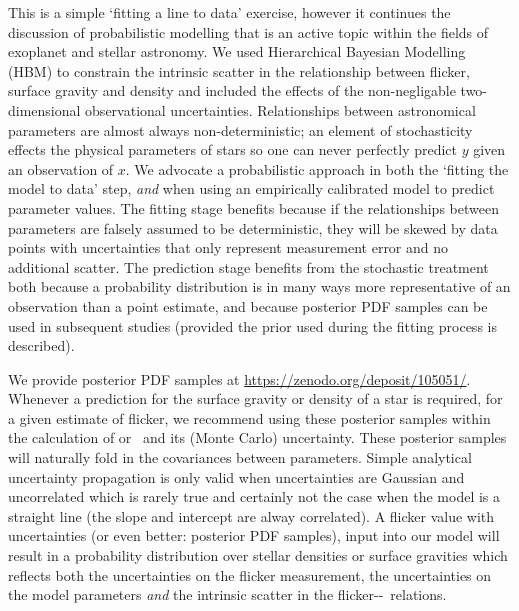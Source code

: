 This is a simple `fitting a line to data' exercise, however it continues the
discussion of probabilistic modelling that is an active topic within the
fields of exoplanet and stellar astronomy.
We used Hierarchical Bayesian Modelling (HBM) to constrain the intrinsic
scatter in the relationship between flicker, surface gravity and density and
included the effects of the non-negligable two-dimensional observational
uncertainties.
Relationships between astronomical parameters are almost always
non-deterministic; an element of stochasticity effects the physical parameters
of stars so one can never perfectly predict $y$ given an observation of $x$.
We advocate a probabilistic approach in both the `fitting the model to data'
step, {\it and} when using an empirically calibrated model to predict
parameter values.
The fitting stage benefits because if the relationships between parameters are
falsely assumed to be deterministic, they will be skewed by data points with
uncertainties that only represent measurement error and no additional scatter.
The prediction stage benefits from the stochastic treatment both because a
probability distribution is in many ways more representative of an observation
than a point estimate, and because posterior PDF samples can be used in
subsequent studies (provided the prior used during the fitting process is
described).

We provide posterior PDF samples at \url{https://zenodo.org/deposit/105051/}.
Whenever a prediction for the surface gravity or density of a star is required,
for a given estimate of flicker, we recommend using these posterior samples
within the calculation of \rhostar or \logg\ and its (Monte Carlo)
uncertainty.
These posterior samples will naturally fold in the covariances between
parameters.
Simple analytical uncertainty propagation is only valid when uncertainties are
Gaussian and uncorrelated which is rarely true and certainly not the case when
the model is a straight line (the slope and intercept are alway correlated).
A flicker value with uncertainties (or even better: posterior PDF
samples), input into our model will result in a probability distribution over
stellar densities or surface gravities which reflects both the uncertainties
on the flicker measurement, the uncertainties on the model parameters {\it and}
the intrinsic scatter in the flicker-\rhostar-\logg\ relations.

